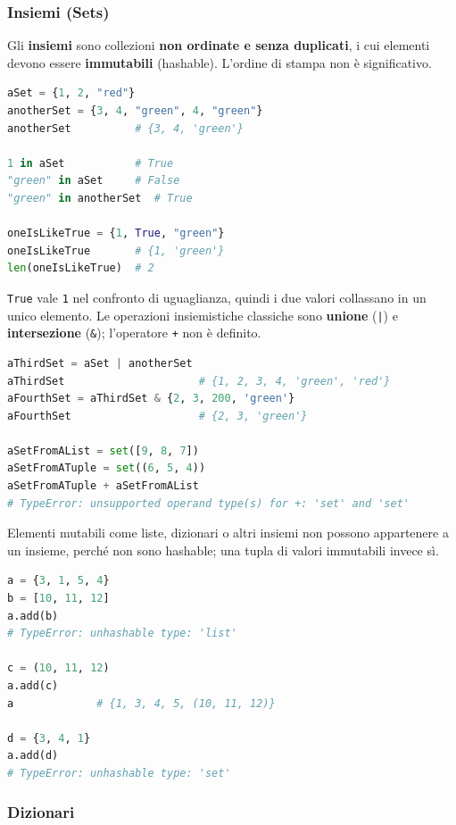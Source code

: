 \documentclass[12pt]{extarticle}
\begin{document}
\subsubsection{Insiemi (Sets)}

\noindent Gli \textbf{insiemi} sono collezioni \textbf{non ordinate e senza duplicati}, i cui elementi devono essere \textbf{immutabili} (hashable). L'ordine di stampa non è significativo.

\begin{lstlisting}[language=Python]
aSet = {1, 2, "red"}
anotherSet = {3, 4, "green", 4, "green"}
anotherSet          # {3, 4, 'green'}

1 in aSet           # True
"green" in aSet     # False
"green" in anotherSet  # True

oneIsLikeTrue = {1, True, "green"}
oneIsLikeTrue       # {1, 'green'}
len(oneIsLikeTrue)  # 2
\end{lstlisting}

\noindent \texttt{True} vale \texttt{1} nel confronto di uguaglianza, quindi i due valori collassano in un unico elemento. Le operazioni insiemistiche classiche sono \textbf{unione} (\texttt{|}) e \textbf{intersezione} (\texttt{\&}); l'operatore \texttt{+} non è definito.

\begin{lstlisting}[language=Python]
aThirdSet = aSet | anotherSet
aThirdSet                     # {1, 2, 3, 4, 'green', 'red'}
aFourthSet = aThirdSet & {2, 3, 200, 'green'}
aFourthSet                    # {2, 3, 'green'}

aSetFromAList = set([9, 8, 7])
aSetFromATuple = set((6, 5, 4))
aSetFromATuple + aSetFromAList
# TypeError: unsupported operand type(s) for +: 'set' and 'set'
\end{lstlisting}

\noindent Elementi mutabili come liste, dizionari o altri insiemi non possono appartenere a un insieme, perché non sono hashable; una tupla di valori immutabili invece sì.

\begin{lstlisting}[language=Python]
a = {3, 1, 5, 4}
b = [10, 11, 12]
a.add(b)
# TypeError: unhashable type: 'list'

c = (10, 11, 12)
a.add(c)
a             # {1, 3, 4, 5, (10, 11, 12)}

d = {3, 4, 1}
a.add(d)
# TypeError: unhashable type: 'set'
\end{lstlisting}

\subsubsection{Dizionari}
\end{document}
